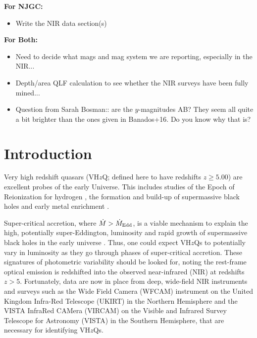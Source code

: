 \documentclass[usenatbib]{mnras}
\begin{document}
\noindent
{\bf For NJGC: }
\begin{itemize}
\item Write the NIR data section(s) 
\end{itemize}

\noindent
{\bf For Both: }
\begin{itemize}
\item Need to decide what mags and mag system we are reporting, especially in the 
NIR...
\item Depth/area QLF calculation to see whether the NIR surveys have been fully mined...
\item Question from Sarah Bosman:: are the $y$-magnitudes AB? They seem all quite a bit brighter than the ones given in Banados+16. Do you know why that is?
\end{itemize}
\fi


\section{Introduction}
Very high redshift quasars (VH$z$Q; defined here to have redshifts
$z\geq5.00$) are excellent probes of the early Universe. This includes
studies of the Epoch of Reionization for hydrogen \citep[see e.g.][for
reviews]{Fan2006review, Mortlock2016}, the formation and build-up of
supermassive black holes \citep[e.g., ][]{Rees1984, WyitheLoeb2003,
Volonteri2010, Agarwal2016, Valiante2018, Latif2018, Wise2019} and
early metal enrichment \citep[see e.g., ][]{Simcoe2012, Chen2017,
Bosman2017}.

Super-critical accretion, where $\dot{M} > \dot{M}_{\rm Edd}$, is a
viable mechanism to explain the high, potentially super-Eddington,
luminosity and rapid growth of supermassive black holes in the early
universe \citep[e.g.,][]{AlexanderNatarajan2014, MadauHaardtDotti2014,
Volonteri2015, Pezzulli2016, Lupi2016, Pezzulli2017, Takeo2018}. Thus,
one could expect VH$z$Qs to potentially vary in luminosity as they go
through phases of super-critical accretion. These signatures of
photometric variability should be looked for, noting the rest-frame
optical emission is redshifted into the observed near-infrared (NIR)
at redshifts $z>5$. Fortunately, data are now in place from deep,
wide-field NIR instruments and surveys such as the Wide Field Camera
(WFCAM) instrument on the United Kingdom Infra-Red Telescope (UKIRT)
in the Northern Hemisphere and the VISTA InfraRed CAMera (VIRCAM) on
the Visible and Infrared Survey Telescope for Astronomy (VISTA) in the
Southern Hemisphere, that are necessary for identifying VH$z$Qs.
\end{document}
